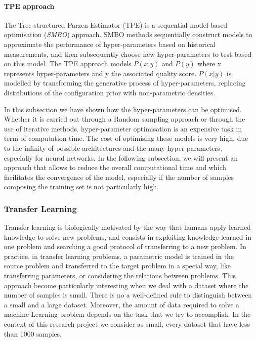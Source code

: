 \paragraph{TPE approach} \label{TPE approach}

The Tree-structured Parzen Estimator (TPE) is a sequential model-based optimisation (\textit{SMBO}) approach. SMBO methods sequentially construct models to approximate the performance of hyper-parameters based on historical measurements, and then subsequently choose new hyper-parameters to test based on this model. The TPE approach models $P(x|y)$ and $P(y)$ where x represents hyper-parameters and y the associated quality score. $P(x|y)$ is modelled by transforming the generative process of hyper-parameters, replacing distributions of the configuration prior with non-parametric densities.

In this subsection we have shown how the hyper-parameters can be optimised. Whether it is carried out through a Random sampling approach or through the use of iterative methods, hyper-parameter optimisation is an expensive task in term of computation time. The cost of optimising these models is very high, due to the inﬁnity of possible architectures and the many hyper-parameters, especially for neural networks. In the following subsection, we will present an approach that allows to reduce the overall computational time and which facilitates the convergence of the model, especially if the number of samples composing the training set is not particularly high.


\subsubsection{Transfer Learning} \label{Transfer Learning}

Transfer learning is biologically motivated by the way that humans apply learned knowledge to solve new problems, and consists in exploiting knowledge learned in one problem and searching a good protocol of transferring to a new problem.
In practice, in transfer learning problems, a parametric model is trained in the source problem and transferred to the target problem in a special way, like transferring parameters, or considering the relations between problems. This approach become particularly interesting when we deal with a dataset where the number of samples is small. There is no a well-defined rule to distinguish between a small and a large dataset. Moreover, the amount of data required to solve a machine Learning problem depends on the task that we try to accomplish. In the context of this research project we consider as small, every dataset that have less than 1000 samples. 

